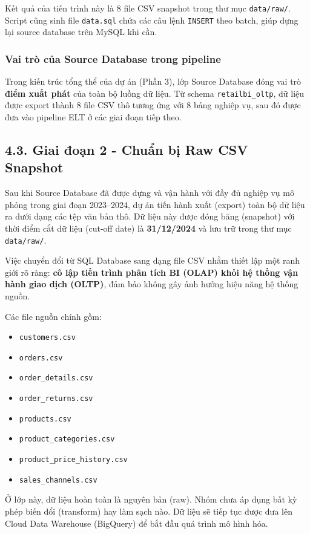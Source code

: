 \documentclass[12pt,a4paper]{article}
\newcommand{\code}[1]{\texttt{#1}}
\begin{document}
Kết quả của tiến trình này là 8 file CSV snapshot trong thư mục \code{data/raw/}. Script cũng sinh file \code{data.sql} chứa các câu lệnh \code{INSERT} theo batch, giúp dựng lại source database trên MySQL khi cần.

\subsubsection{Vai trò của Source Database trong pipeline}

Trong kiến trúc tổng thể của dự án (Phần 3), lớp Source Database đóng vai trò \textbf{điểm xuất phát} của toàn bộ luồng dữ liệu. Từ schema \code{retailbi\_oltp}, dữ liệu được export thành 8 file CSV thô tương ứng với 8 bảng nghiệp vụ, sau đó được đưa vào pipeline ELT ở các giai đoạn tiếp theo.

\subsection{4.3. Giai đoạn 2 - Chuẩn bị Raw CSV Snapshot}

Sau khi Source Database đã được dựng và vận hành với đầy đủ nghiệp vụ mô phỏng trong giai đoạn 2023--2024, dự án tiến hành xuất (export) toàn bộ dữ liệu ra dưới dạng các tệp văn bản thô. Dữ liệu này được đóng băng (snapshot) với thời điểm cắt dữ liệu (cut-off date) là \textbf{31/12/2024} và lưu trữ trong thư mục \code{data/raw/}.

Việc chuyển đổi từ SQL Database sang dạng file CSV nhằm thiết lập một ranh giới rõ ràng: \textbf{cô lập tiến trình phân tích BI (OLAP) khỏi hệ thống vận hành giao dịch (OLTP)}, đảm bảo không gây ảnh hưởng hiệu năng hệ thống nguồn.

Các file nguồn chính gồm:

\begin{itemize}
    \item \code{customers.csv}
    \item \code{orders.csv}
    \item \code{order\_details.csv}
    \item \code{order\_returns.csv}
    \item \code{products.csv}
    \item \code{product\_categories.csv}
    \item \code{product\_price\_history.csv}
    \item \code{sales\_channels.csv}
\end{itemize}

Ở lớp này, dữ liệu hoàn toàn là nguyên bản (raw). Nhóm chưa áp dụng bất kỳ phép biến đổi (transform) hay làm sạch nào. Dữ liệu sẽ tiếp tục được đưa lên Cloud Data Warehouse (BigQuery) để bắt đầu quá trình mô hình hóa.
\end{document}
